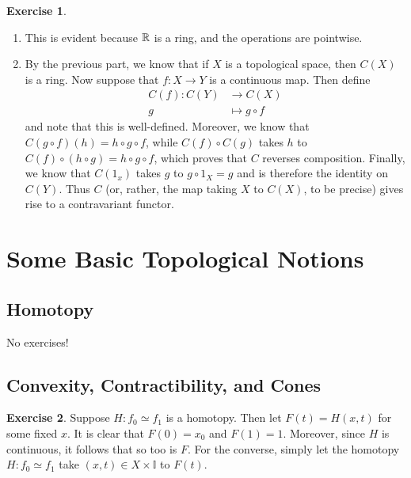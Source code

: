 \documentclass[10pt]{article}
\theoremstyle{definition}
\newtheorem{intex}{Exercise}[section]
\newenvironment{exercise}{\begin{intex}\label{\theintex}}{\end{intex}}
\newcommand*\II{\mathbb I}
\begin{document}
\begin{exercise} \leavevmode
\begin{enumerate}
\item This is evident because $\mathbb{R}$ is a ring, and the operations are pointwise. 

\item By the previous part, we know that if $X$ is a topological space, then $C(X)$ is a ring. Now suppose that $f:X\to Y$ is a continuous map. Then define \begin{align*}C(f):C(Y)&\to C(X)\\g&\mapsto g\circ f\end{align*} and note that this is well-defined. Moreover, we know that $C(g\circ f)(h)=h\circ g\circ f$, while $C(f)\circ C(g)$ takes $h$ to $C(f)\circ(h\circ g)=h\circ g\circ f$, which proves that $C$ reverses composition. Finally, we know that $C(1_x)$ takes $g$ to $g\circ 1_X=g$ and is therefore the identity on $C(Y)$. Thus $C$ (or, rather, the map taking $X$ to $C(X)$, to be precise) gives rise to a contravariant functor. 
\end{enumerate}
\end{exercise} 

\newpage

\section{Some Basic Topological Notions} 
\subsection{Homotopy} 
No exercises! 

\subsection{Convexity, Contractibility, and Cones} 
\begin{exercise} \leavevmode
Suppose $H:f_0\simeq f_1$ is a homotopy. Then let $F(t)=H(x,t)$ for some fixed $x$. It is clear that $F(0)=x_0$ and $F(1)=1$. Moreover, since $H$ is continuous, it follows that so too is $F$. For the converse, simply let the homotopy $H:f_0\simeq f_1$ take $(x,t)\in X\times\II$ to $F(t)$. 
\end{exercise} 
\end{document}

